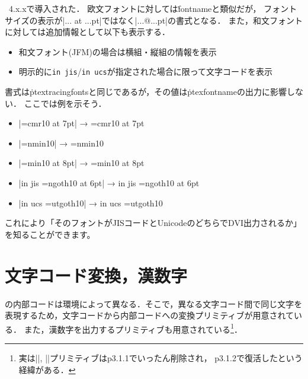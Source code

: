\documentclass[a4paper,11pt,nomag,dvipdfmx]{jsarticle}
\def\code#1{\texttt{#1}}
\begin{document}
\begin{cslist}
\ifx\ptexfontname\undefined\else
%
\csitem[\.{ptexfontname}]
  \pTeX~4.x.xで導入された．
  欧文フォントに対しては\.{fontname}と類似だが，
  フォントサイズの表示が|... at ...pt|ではなく|...@...pt|の書式となる．
  また，和文フォントに対しては追加情報として以下も表示する．
   \begin{itemize}
    \item 和文フォント(JFM)の場合は横組・縦組の情報を表示
    \item 明示的に\verb+in jis+/\verb+in ucs+が指定された場合に限って文字コードを表示
   \end{itemize}
  書式は\.{ptextracingfonts}と同じであるが，その値は\.{ptexfontname}の出力に影響しない．
  ここでは例を示そう．
 \begin{itemize}
  \item |\font\x=cmr10 at 7pt| → {\font\x=cmr10 at 7pt \code{\ptexfontname\x}}
  \item |\font\x=nmin10| → {\font\x=nmin10 \code{\ptexfontname\x}}
  \item |\font\x=min10 at 8pt| → {\font\x=min10 at 8pt \code{\ptexfontname\x}}
  \item |\font in jis \x=ngoth10 at 6pt| → {\font in jis \x=ngoth10 at 6pt \code{\ptexfontname\x}}
  \item |\font in ucs \x=utgoth10| → {\font in ucs \x=utgoth10 \code{\ptexfontname\x}}
 \end{itemize}
  これにより「そのフォントがJISコードとUnicodeのどちらでDVI出力されるか」を知ることができます。
%
\fi
\end{cslist}

\section{文字コード変換，漢数字}

\pTeX の内部コードは環境によって異なる．そこで，異なる文字コード間で同じ文字を
表現するため，文字コードから内部コードへの変換プリミティブが用意されている．
また，漢数字を出力するプリミティブも用意されている\footnote{%
実は|\kansuji|, |\kansujichar|プリミティブはp3.1.1でいったん削除され，
p3.1.2で復活したという経緯がある．}．
\end{document}
